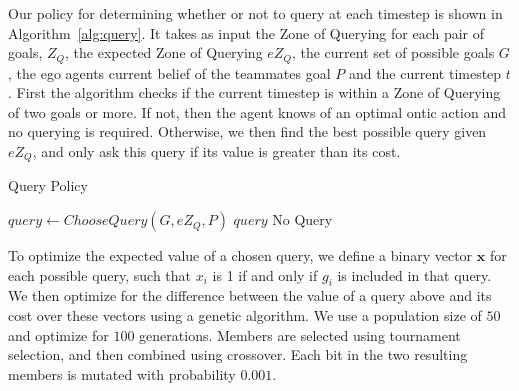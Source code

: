 \documentclass[letterpaper]{article}
\begin{document}
Our policy for determining whether or not to query at each timestep is shown in Algorithm~\ref{alg:query}. It takes as input the Zone of Querying for each pair of goals, $Z_Q$, the expected Zone of Querying $eZ_Q$, the current set of possible goals $G$, the ego agents current belief of the teammates goal $P$ and the current timestep $t$. First the algorithm checks if the current timestep is within a Zone of Querying of two goals or more. If not, then the agent knows of an optimal ontic action and no querying is required. Otherwise, we then find the best possible query given $eZ_Q$, and only ask this query if its value is greater than its cost.
\begin{algorithm}[t]
\caption{Query Policy}
\begin{algorithmic}
\State $query \gets ChooseQuery(G, eZ_Q, P)$
\State \Return $query$
\EndIf
\EndIf
\State \Return No Query
\EndProcedure
\end{algorithmic}
\label{alg:query}
\end{algorithm}

To optimize the expected value of a chosen query, we define a binary vector $\textbf{x}$ for each possible query, such that $x_i$ is 1 if and only if $g_i$ is included in that query. We then optimize for the difference between the value of a query above and its cost over these vectors using a genetic algorithm. We use a population size of $50$ and optimize for $100$ generations. Members are selected using tournament selection, and then combined using crossover. Each bit in the two resulting members is mutated with probability $0.001$.
\end{document}
